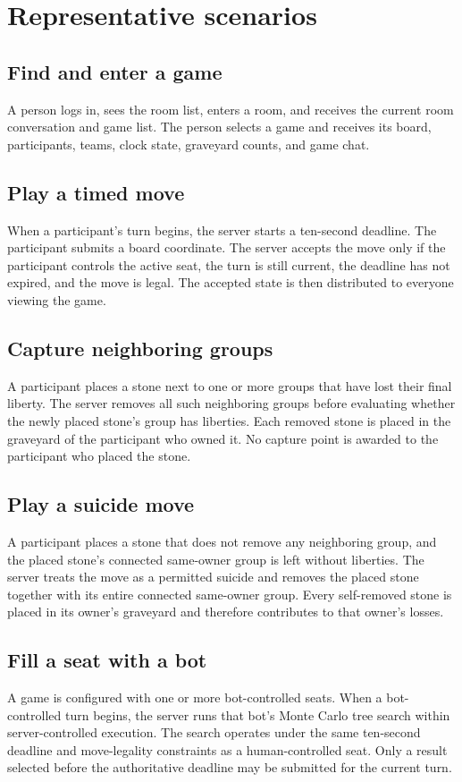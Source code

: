 \documentclass[11pt,oneside]{book}
\begin{document}
\section{Representative scenarios}
\subsection{Find and enter a game}
A person logs in, sees the room list, enters a room, and receives the current room conversation and game list. The person selects a game and receives its board, participants, teams, clock state, graveyard counts, and game chat.

\subsection{Play a timed move}
When a participant's turn begins, the server starts a ten-second deadline. The participant submits a board coordinate. The server accepts the move only if the participant controls the active seat, the turn is still current, the deadline has not expired, and the move is legal. The accepted state is then distributed to everyone viewing the game.

\subsection{Capture neighboring groups}
A participant places a stone next to one or more groups that have lost their final liberty. The server removes all such neighboring groups before evaluating whether the newly placed stone's group has liberties. Each removed stone is placed in the graveyard of the participant who owned it. No capture point is awarded to the participant who placed the stone.

\subsection{Play a suicide move}
A participant places a stone that does not remove any neighboring group, and the placed stone's connected same-owner group is left without liberties. The server treats the move as a permitted suicide and removes the placed stone together with its entire connected same-owner group. Every self-removed stone is placed in its owner's graveyard and therefore contributes to that owner's losses.

\subsection{Fill a seat with a bot}
A game is configured with one or more bot-controlled seats. When a bot-controlled turn begins, the server runs that bot's Monte Carlo tree search within server-controlled execution. The search operates under the same ten-second deadline and move-legality constraints as a human-controlled seat. Only a result selected before the authoritative deadline may be submitted for the current turn.
\end{document}
